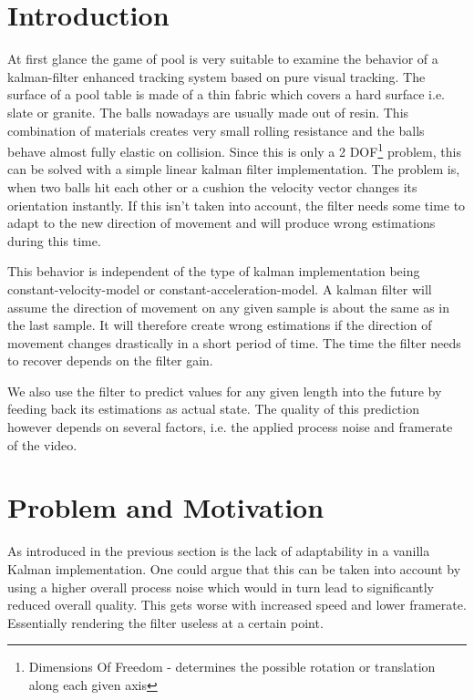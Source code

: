 \documentclass[titlepage, a4paper, 11pt]{scrartcl}
\begin{document}
\begin{multicols}{2}

    \section{Introduction}
    At first glance the game of pool is very suitable to examine the behavior of a kalman-filter enhanced tracking system based on pure visual tracking. 
    The surface of a pool table is made of a thin fabric which covers a hard surface i.e. slate or granite.
    The balls nowadays are usually made out of resin. This combination of materials creates very small rolling resistance and the balls behave almost fully elastic on collision.
    Since this is only a 2 DOF\footnote{Dimensions Of Freedom - determines the possible rotation or translation along each given axis} problem, this can be solved with a simple linear kalman filter implementation. 
    The problem is, when two balls hit each other or a cushion the velocity vector changes its orientation instantly. 
    If this isn't taken into account, the filter needs some time to adapt to the new direction of movement and will produce wrong estimations during this time.

    This behavior is independent of the type of kalman implementation being constant-velocity-model or constant-acceleration-model.
    A kalman filter will assume the direction of movement on any given sample is about the same as in the last sample. 
    It will therefore create wrong estimations if the direction of movement changes drastically in a short period of time. The time the filter needs to recover depends on the filter gain.

    We also use the filter to predict values for any given length into the future by feeding back its estimations as actual state. 
    The quality of this prediction however depends on several factors, i.e. the applied process noise and framerate of the video.

    \section{Problem and Motivation}
    As introduced in the previous section is the lack of adaptability in a vanilla Kalman implementation.
    One could argue that this can be taken into account by using a higher overall process noise which would in turn lead to significantly reduced overall quality.
    This gets worse with increased speed and lower framerate. Essentially rendering the filter useless at a certain point.


\end{multicols}
\end{document}
